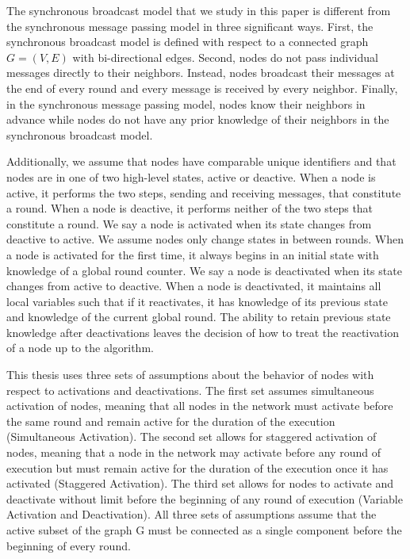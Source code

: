 \documentclass[english]{article}
\begin{document}
The synchronous broadcast model that we study in this paper is different from the synchronous message passing model in three significant ways. First, the synchronous broadcast model is defined with respect to a connected graph $G=(V,E)$ with bi-directional edges. Second, nodes do not pass individual messages directly to their neighbors. Instead, nodes broadcast their messages at the end of every round and every message is received by every neighbor. Finally, in the synchronous message passing model, nodes know their neighbors in advance while nodes do not have any prior knowledge of their neighbors in the synchronous broadcast model.

Additionally, we assume that nodes have comparable unique identifiers and that nodes are in one of two high-level states, active or deactive. When a node is active, it performs the two steps, sending and receiving messages, that constitute a round. When a node is deactive, it performs neither of the two steps that constitute a round. We say a node is activated when its state changes from deactive to active. We assume nodes only change states in between rounds. When a node is activated for the first time, it always begins in an initial state with knowledge of a global round counter. We say a node is deactivated when its state changes from active to deactive. When a node is deactivated, it maintains all local variables such that if it reactivates, it has knowledge of its previous state and knowledge of the current global round. The ability to retain previous state knowledge after deactivations leaves the decision of how to treat the reactivation of a node up to the algorithm.

This thesis uses three sets of assumptions about the behavior of nodes with respect to activations and deactivations. The first set assumes simultaneous activation of nodes, meaning that all nodes in the network must activate before the same round and remain active for the duration of the execution (Simultaneous Activation). The second set allows for staggered activation of nodes, meaning that a node in the network may activate before any round of execution but must remain active for the duration of the execution once it has activated (Staggered Activation). The third set allows for nodes to activate and deactivate without limit before the beginning of any round of execution (Variable Activation and Deactivation). All three sets of assumptions assume that the active subset of the graph G must be connected as a single component before the beginning of every round.
\end{document}
